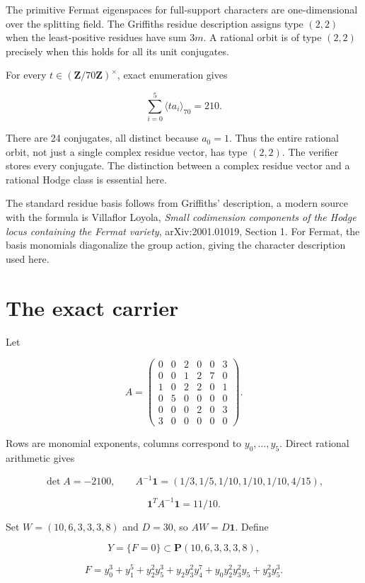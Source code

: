 The primitive Fermat eigenspaces for full-support characters are
one-dimensional over the splitting field. The Griffiths residue
description assigns type \((2,2)\) when the least-positive residues have
sum \(3m\). A rational orbit is of type \((2,2)\) precisely when this
holds for all its unit conjugates.

For every \(t\in(\mathbf Z/70\mathbf Z)^\times\), exact enumeration
gives

\[
\sum_{i=0}^{5}\langle ta_i\rangle_{70}=210.
\]

There are 24 conjugates, all distinct because \(a_0=1\). Thus the entire
rational orbit, not just a single complex residue vector, has type
\((2,2)\). The verifier stores every conjugate. The distinction between
a complex residue vector and a rational Hodge class is essential here.

The standard residue basis follows from Griffiths' description, a modern
source with the formula is Villaflor Loyola, \emph{Small codimension
components of the Hodge locus containing the Fermat variety},
arXiv:2001.01019, Section 1. For Fermat, the basis monomials diagonalize
the group action, giving the character description used here.

\hypertarget{carrier70-the-exact-carrier}{%
\section{The exact carrier}\label{carrier70-the-exact-carrier}}

Let

\[
A=\begin{pmatrix}
0&0&2&0&0&3\\
0&0&1&2&7&0\\
1&0&2&2&0&1\\
0&5&0&0&0&0\\
0&0&0&2&0&3\\
3&0&0&0&0&0
\end{pmatrix}.
\]

Rows are monomial exponents, columns correspond to \(y_0,\ldots,y_5\).
Direct rational arithmetic gives

\[
\det A=-2100,\qquad
A^{-1}\mathbf1=(1/3,1/5,1/10,1/10,1/10,4/15),
\]

\[
\mathbf1^TA^{-1}\mathbf1=11/10.
\]

Set \(W=(10,6,3,3,3,8)\) and \(D=30\), so \(AW=D\mathbf1\). Define

\[
Y=\{F=0\}\subset\mathbf P(10,6,3,3,3,8),
\]

\[
F=y_0^3+y_1^5+y_2^2y_5^3+y_2y_3^2y_4^7
  +y_0y_2^2y_3^2y_5+y_3^2y_5^3.
\]

